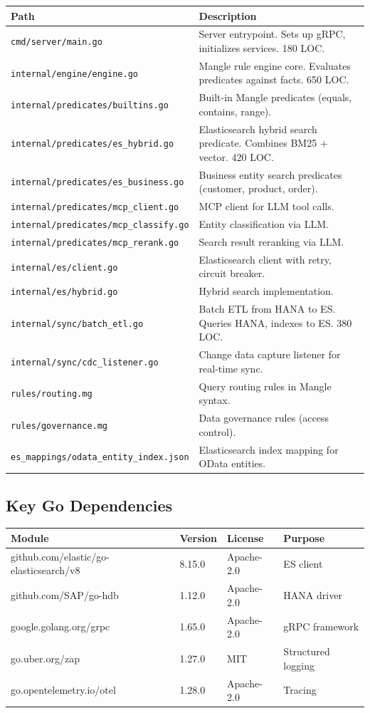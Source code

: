 \documentclass[11pt,a4paper]{article}
\begin{document}
\begin{longtable}{@{}L{6cm}L{8cm}@{}}
\toprule
\textbf{Path} & \textbf{Description} \\
\midrule
\endhead
\texttt{cmd/server/main.go} & Server entrypoint. Sets up gRPC, initializes services. 180 LOC. \\
\texttt{internal/engine/engine.go} & Mangle rule engine core. Evaluates predicates against facts. 650 LOC. \\
\texttt{internal/predicates/builtins.go} & Built-in Mangle predicates (equals, contains, range). \\
\texttt{internal/predicates/es\_hybrid.go} & Elasticsearch hybrid search predicate. Combines BM25 + vector. 420 LOC. \\
\texttt{internal/predicates/es\_business.go} & Business entity search predicates (customer, product, order). \\
\texttt{internal/predicates/mcp\_client.go} & MCP client for LLM tool calls. \\
\texttt{internal/predicates/mcp\_classify.go} & Entity classification via LLM. \\
\texttt{internal/predicates/mcp\_rerank.go} & Search result reranking via LLM. \\
\texttt{internal/es/client.go} & Elasticsearch client with retry, circuit breaker. \\
\texttt{internal/es/hybrid.go} & Hybrid search implementation. \\
\texttt{internal/sync/batch\_etl.go} & Batch ETL from HANA to ES. Queries HANA, indexes to ES. 380 LOC. \\
\texttt{internal/sync/cdc\_listener.go} & Change data capture listener for real-time sync. \\
\texttt{rules/routing.mg} & Query routing rules in Mangle syntax. \\
\texttt{rules/governance.mg} & Data governance rules (access control). \\
\texttt{es\_mappings/odata\_entity\_index.json} & Elasticsearch index mapping for OData entities. \\
\bottomrule
\end{longtable}

\subsection{Key Go Dependencies}

\begin{longtable}{@{}L{5cm}L{2cm}L{2.5cm}L{4cm}@{}}
\toprule
\textbf{Module} & \textbf{Version} & \textbf{License} & \textbf{Purpose} \\
\midrule
\endhead
github.com/elastic/go-elasticsearch/v8 & 8.15.0 & Apache-2.0 & ES client \\
github.com/SAP/go-hdb & 1.12.0 & Apache-2.0 & HANA driver \\
google.golang.org/grpc & 1.65.0 & Apache-2.0 & gRPC framework \\
go.uber.org/zap & 1.27.0 & MIT & Structured logging \\
go.opentelemetry.io/otel & 1.28.0 & Apache-2.0 & Tracing \\
\bottomrule
\end{longtable}
\end{document}
